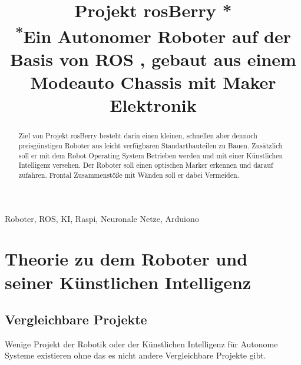 \documentclass[conference]{IEEEtran}
\begin{document}
\title{Projekt rosBerry *\\
{\footnotesize \textsuperscript{*}Ein Autonomer Roboter auf der Basis von ROS , gebaut aus einem Modeauto Chassis mit Maker Elektronik}}

\author{
%
\and
{}
\and
{}
}

\maketitle

\begin{abstract}
Ziel von Projekt rosBerry besteht darin einen kleinen, schnellen aber dennoch preisgünstigen Roboter aus leicht verfügbaren Standartbauteilen zu Bauen. Zusätzlich soll er mit dem Robot Operating System Betrieben werden und mit einer Künstlichen Intelligenz versehen. Der Roboter soll einen optischen Marker erkennen und darauf zufahren. Frontal Zusammenstöße mit Wänden soll er dabei Vermeiden. 
\end{abstract}

\begin{IEEEkeywords}
Roboter, ROS, KI, Raspi, Neuronale Netze, Arduiono
\end{IEEEkeywords}

\section{Theorie zu dem Roboter und seiner Künstlichen Intelligenz}

\subsection{Vergleichbare Projekte}	%
Wenige Projekt der Robotik oder der Künstlichen Intelligenz für Autonome Systeme  existieren ohne das es nicht andere Vergleichbare Projekte gibt. \\
\end{document}
